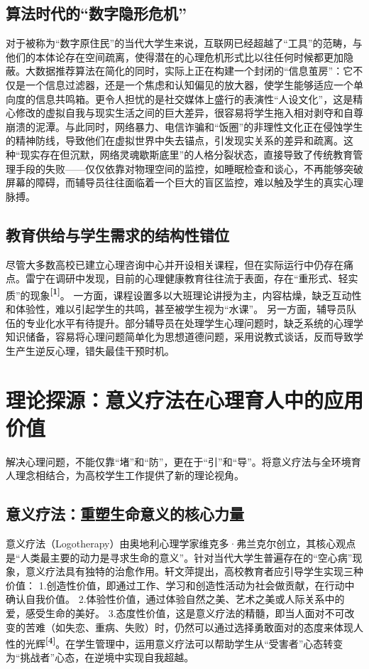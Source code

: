 \documentclass[a4paper,12pt]{ctexart}
\newcommand{\upcite}[1]{\textbf{\textsuperscript{[#1]}}}
\begin{document}
\subsection{算法时代的“数字隐形危机”}
对于被称为“数字原住民”的当代大学生来说，互联网已经超越了“工具”的范畴，与他们的本体论存在空间疏离，使得潜在的心理危机形式比以往任何时候都更加隐蔽。大数据推荐算法在简化的同时，实际上正在构建一个封闭的“信息茧房”：它不仅是一个信息过滤器，还是一个焦虑和认知偏见的放大器，使学生能够适应一个单向度的信息共鸣箱。更令人担忧的是社交媒体上盛行的表演性“人设文化”，这是精心修改的虚拟自我与现实生活之间的巨大差异，很容易将学生拖入相对剥夺和自尊崩溃的泥潭。与此同时，网络暴力、电信诈骗和“饭圈”的非理性文化正在侵蚀学生的精神防线，导致他们在虚拟世界中失去锚点，引发现实关系的差异和疏离。这种“现实存在但沉默，网络灵魂歇斯底里”的人格分裂状态，直接导致了传统教育管理手段的失败——仅仅依靠对物理空间的监控，如睡眠检查和谈心，不再能够突破屏幕的障碍，而辅导员往往面临着一个巨大的盲区监控，难以触及学生的真实心理脉搏。

\subsection{教育供给与学生需求的结构性错位}
尽管大多数高校已建立心理咨询中心并开设相关课程，但在实际运行中仍存在痛点。雷宁在调研中发现，目前的心理健康教育往往流于表面，存在“重形式、轻实质”的现象\upcite{1}。
一方面，课程设置多以大班理论讲授为主，内容枯燥，缺乏互动性和体验性，难以引起学生的共鸣，甚至被学生视为“水课”。
另一方面，辅导员队伍的专业化水平有待提升。部分辅导员在处理学生心理问题时，缺乏系统的心理学知识储备，容易将心理问题简单化为思想道德问题，采用说教式谈话，反而导致学生产生逆反心理，错失最佳干预时机。

\section{理论探源：意义疗法在心理育人中的应用价值}

解决心理问题，不能仅靠“堵”和“防”，更在于“引”和“导”。将意义疗法与全环境育人理念相结合，为高校学生工作提供了新的理论视角。

\subsection{意义疗法：重塑生命意义的核心力量}
意义疗法（Logotherapy）由奥地利心理学家维克多·弗兰克尔创立，其核心观点是“人类最主要的动力是寻求生命的意义”。针对当代大学生普遍存在的“空心病”现象，意义疗法具有独特的治愈作用。轩文萍提出，高校教育者应引导学生实现三种价值：
1.创造性价值，即通过工作、学习和创造性活动为社会做贡献，在行动中确认自我价值。
2.体验性价值，通过体验自然之美、艺术之美或人际关系中的爱，感受生命的美好。
3.态度性价值，这是意义疗法的精髓，即当人面对不可改变的苦难（如失恋、重病、失败）时，仍然可以通过选择勇敢面对的态度来体现人性的光辉\upcite{4}。在学生管理中，运用意义疗法可以帮助学生从“受害者”心态转变为“挑战者”心态，在逆境中实现自我超越。
\end{document}
